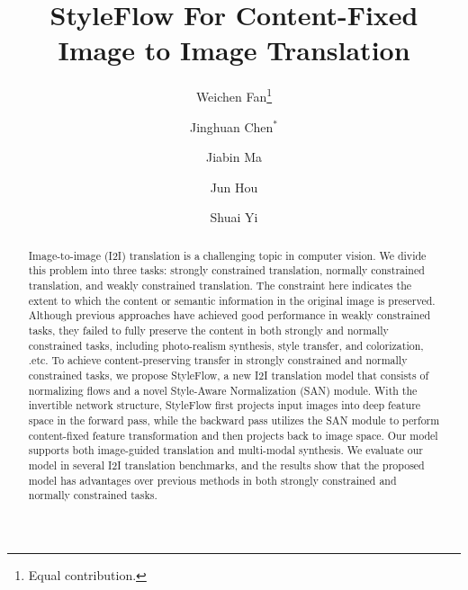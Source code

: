 \documentclass[runningheads]{llncs}
\begin{document}
\pagestyle{headings}
\mainmatter
\def\ECCVSubNumber{4368}  

\title{StyleFlow For Content-Fixed Image to Image Translation} 

\begin{comment}
\titlerunning{ECCV-22 submission ID \ECCVSubNumber} 
\authorrunning{ECCV-22 submission ID \ECCVSubNumber} 
\author{Anonymous ECCV submission}
\institute{Paper ID \ECCVSubNumber}
\end{comment}


\author{Weichen Fan\thanks{Equal contribution.} \and
Jinghuan Chen$^{*}$ \and Jiabin Ma \and Jun Hou \and Shuai Yi}


\maketitle

\begin{abstract}
Image-to-image (I2I) translation is a challenging topic in computer vision. We divide this problem into three tasks: strongly constrained translation, normally constrained translation, and weakly constrained translation. The constraint here indicates the extent to which the content or semantic information in the original image is preserved. Although previous approaches have achieved good performance in weakly constrained tasks, they failed to fully preserve the content in both strongly and normally constrained tasks, including photo-realism synthesis, style transfer, and colorization, .etc. To achieve content-preserving transfer in strongly constrained and normally constrained tasks, we propose StyleFlow, a new I2I translation model that consists of normalizing flows and a novel Style-Aware Normalization (SAN) module. With the invertible network structure, StyleFlow first projects input images into deep feature space in the forward pass, while the backward pass utilizes the SAN module to perform content-fixed feature transformation and then projects back to image space. Our model supports both image-guided translation and multi-modal synthesis. We evaluate our model in several I2I translation benchmarks, and the results show that the proposed model has advantages over previous methods in both strongly constrained and normally constrained tasks.
\end{abstract}
\end{document}
